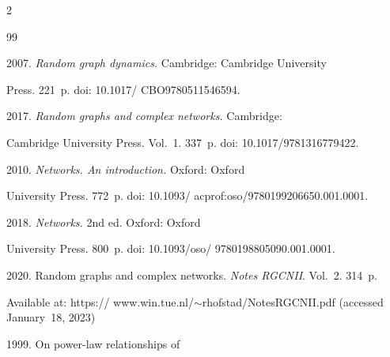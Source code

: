   \begin{multicols}{2}



\renewcommand{\bibname}{\protect\rmfamily References}




{\small\frenchspacing

 {%


 \begin{thebibliography}{99} 


 2007. \textit{Random graph dynamics.} Cambridge: Cambridge University

Press. 221~p. doi: 10.1017/ CBO9780511546594.




 2017. \textit{Random graphs and complex networks.} Cambridge:

Cambridge University Press.   Vol.~1. 337~p. doi: 10.1017/9781316779422.




 2010. \textit{Networks. An introduction.} Oxford: Oxford

University Press. 772~p. doi: 10.1093/ acprof:oso/9780199206650.001.0001.




 2018. \textit{Networks.} 2nd ed. Oxford: Oxford

University Press. 800~p. doi: 10.1093/oso/ 9780198805090.001.0001.




 2020. Random graphs and complex networks.  \textit{Notes RGCNII}. Vol.~2. 314~p.

Available at: {\sf https:// www.win.tue.nl/$\sim$rhofstad/NotesRGCNII.pdf} (accessed January~18, 2023)








 1999. On power-law relationships of


\end{thebibliography}}}
\end{multicols}

